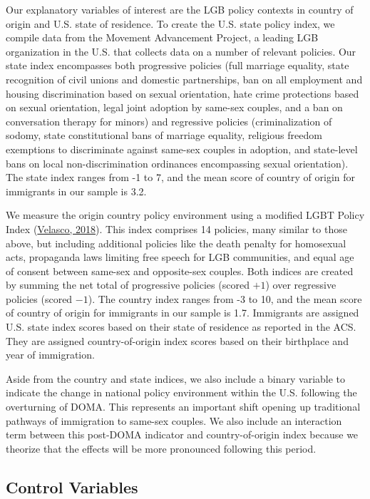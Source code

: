 \documentclass[
  11pt,
]{article}
\begin{document}
Our explanatory variables of interest are the LGB policy contexts in country of origin and U.S. state of residence. To create the U.S. state policy index, we compile data from the Movement Advancement Project, a leading LGB organization in the U.S. that collects data on a number of relevant policies. Our state index encompasses both progressive policies (full marriage equality, state recognition of civil unions and domestic partnerships, ban on all employment and housing discrimination based on sexual orientation, hate crime protections based on sexual orientation, legal joint adoption by same-sex couples, and a ban on conversation therapy for minors) and regressive policies (criminalization of sodomy, state constitutional bans of marriage equality, religious freedom exemptions to discriminate against same-sex couples in adoption, and state-level bans on local non-discrimination ordinances encompassing sexual orientation). The state index ranges from -1 to 7, and the mean score of country of origin for immigrants in our sample is 3.2.

We measure the origin country policy environment using a modified LGBT Policy Index (\protect\hyperlink{ref-velasco_2018}{Velasco, 2018}). This index comprises 14 policies, many similar to those above, but including additional policies like the death penalty for homosexual acts, propaganda laws limiting free speech for LGB communities, and equal age of consent between same-sex and opposite-sex couples. Both indices are created by summing the net total of progressive policies (scored \(+1\)) over regressive policies (scored \(-1\)). The country index ranges from -3 to 10, and the mean score of country of origin for immigrants in our sample is 1.7.
Immigrants are assigned U.S. state index scores based on their state of residence as reported in the ACS. They are assigned country-of-origin index scores based on their birthplace and year of immigration.

Aside from the country and state indices, we also include a binary variable to indicate the change in national policy environment within the U.S. following the overturning of DOMA. This represents an important shift opening up traditional pathways of immigration to same-sex couples. We also include an interaction term between this post-DOMA indicator and country-of-origin index because we theorize that the effects will be more pronounced following this period.

\hypertarget{control-variables}{%
\subsection{Control Variables}\label{control-variables}}
\end{document}

